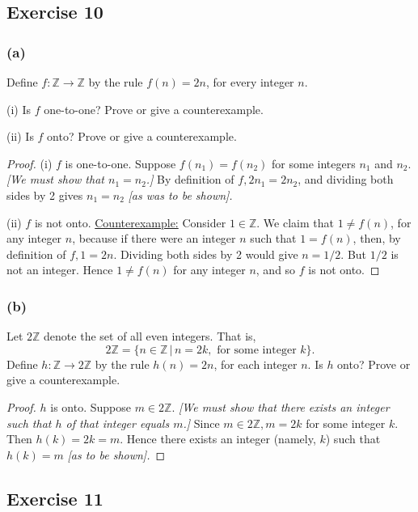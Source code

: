 \documentclass[14pt]{extarticle}
\newcommand{\Z}{\mathbb{Z}}
\begin{document}
\subsection{Exercise 10}
\subsubsection{(a)}
Define \(f: \Z \to \Z\) by the rule \(f(n) = 2n\), for every integer $n$.

(i) Is $f$ one-to-one? Prove or give a counterexample.

(ii) Is $f$ onto? Prove or give a counterexample.

\begin{proof}
    (i) $f$ is one-to-one. Suppose \(f(n_1) = f(n_2)\) for some integers $n_1$ and $n_2$. {\it [We must show that \(n_1 =
                n_2\).]} By definition of \(f, 2n_1 = 2n_2\), and dividing both sides by 2 gives $n_1 = n_2$ {\it [as was to be shown].}

    (ii) $f$ is not onto. \underline{Counterexample:} Consider \(1 \in \Z\). We claim that \(1 \neq f(n)\), for any
    integer $n$, because if there were an integer $n$ such that \(1 = f(n)\), then, by definition of \(f, 1 = 2n\).
    Dividing both sides by 2 would give \(n = 1/2\). But $1/2$ is not an integer. Hence \(1 \neq f(n)\) for any integer
    $n$, and so $f$ is not onto.
\end{proof}

\subsubsection{(b)}
Let $2\Z$ denote the set of all even integers. That is,
\[
    2\Z = \{n \in \Z \,|\,n=2k, \text{ for some integer } k\}.
\]
Define \(h: \Z \to 2\Z\) by the rule \(h(n) = 2n\), for each integer $n$. Is $h$ onto? Prove or give a counterexample.

\begin{proof}
    $h$ is onto. Suppose \(m \in 2\Z\). {\it [We must show that there exists an integer such that $h$ of that integer
                equals $m$.]} Since \(m \in 2\Z, m = 2k\) for some integer $k$. Then \(h(k) = 2k = m\). Hence there exists an integer
    (namely, $k$) such that \(h(k) = m\) {\it [as to be shown].}
\end{proof}

\subsection{Exercise 11}
\end{document}
